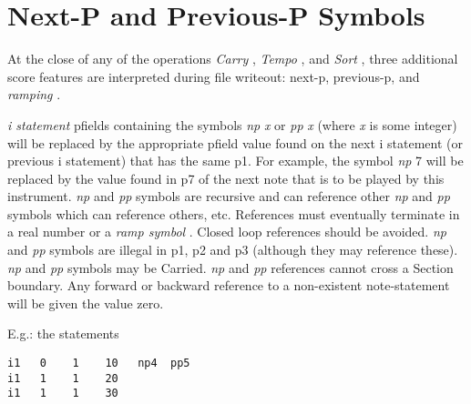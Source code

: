 \begin{comment}
\documentclass[10pt]{article}
\usepackage{fullpage, graphicx, url}
\setlength{\parskip}{1ex}
\setlength{\parindent}{0ex}
\title{Next-P and Previous-P Symbols}



\begin{tabular}{ccc}
The Alternative Csound Reference Manual & & \\
Previous &The Standard Numeric Score &Next

\end{tabular}

\end{comment}
\section{Next-P and Previous-P Symbols}


  At the close of any of the operations \emph{Carry}
, \emph{Tempo}
, and \emph{Sort}
, three additional score features are interpreted during file writeout: next-p, previous-p, and \emph{ramping}
. 


 \emph{i statement}
 pfields containing the symbols \emph{np}
\emph{x}
 or \emph{pp}
\emph{x}
 (where \emph{x}
 is some integer) will be replaced by the appropriate pfield value found on the next i statement (or previous i statement) that has the same p1. For example, the symbol \emph{np}
7 will be replaced by the value found in p7 of the next note that is to be played by this instrument. \emph{np}
 and \emph{pp }
symbols are recursive and can reference other \emph{np}
 and \emph{pp}
 symbols which can reference others, etc. References must eventually terminate in a real number or a \emph{ramp symbol}
. Closed loop references should be avoided. \emph{np}
 and \emph{pp}
 symbols are illegal in p1, p2 and p3 (although they may reference these). \emph{np}
 and \emph{pp}
 symbols may be Carried. \emph{np}
 and \emph{pp}
 references cannot cross a Section boundary. Any forward or backward reference to a non-existent note-statement will be given the value zero. 


  E.g.: the statements 


 
\begin{lstlisting}
i1   0    1    10   np4  pp5 
i1   1    1    20
i1   1    1    30
     
\end{lstlisting}


